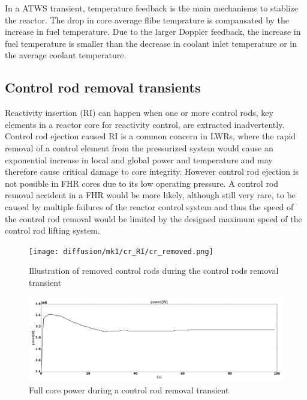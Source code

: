 \documentclass{elsarticle}
\begin{document}
In a ATWS transient, temperature feedback is the main mechanisms to stablize the reactor. The drop in core average flibe temprature is compansated by the increase in fuel temperature. Due to the larger Doppler feedback, the increase in fuel temperature is smaller than the decrease in coolant inlet temperature or in the average coolant temperature. 



\subsection{Control rod removal transients}
 Reactivity insertion (RI) can happen when one or more control rods, key elements in a reactor core for reactivity control, are extracted inadvertently. Control rod ejection caused RI is a common concern in LWRs, where the rapid removal of a control element from the pressurized system would cause an exponential increase in local and global power and temperature and may therefore cause critical damage to core integrity. However control rod ejection is not possible in FHR cores due to its low operating pressure. A control rod removal accident in a FHR would be more likely, although still very rare, to be caused by multiple failures of the reactor control system and thus the speed of the control rod removal would be limited by the designed maximum speed of the control rod  lifting system.


\begin{figure}
    \centering
    \texttt{[image: diffusion/mk1/cr\_RI/cr\_removed.png]}
    \caption{Illustration of removed control rods during the control rods removal transient}
    \label{fig:mk1_rods_removed}
\end{figure}




\begin{figure}
    \centering
    \includegraphics[width=\textwidth]{images/diffusion/mk1/cr_RI/power.png}
    \caption{Full core power during a control rod removal transient}
    \label{fig:multi_comp_power}
\end{figure}
\end{document}
